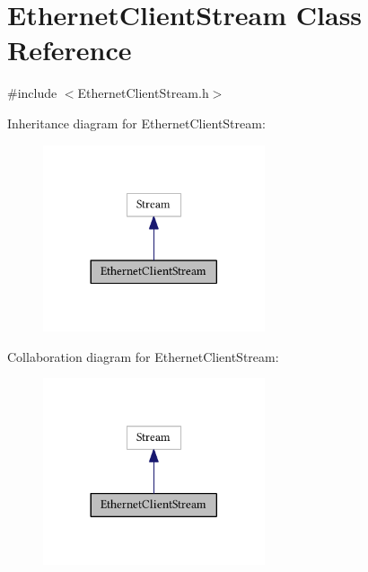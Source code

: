 \hypertarget{class_ethernet_client_stream}{}\section{Ethernet\+Client\+Stream Class Reference}
\label{class_ethernet_client_stream}


{\ttfamily \#include $<$Ethernet\+Client\+Stream.\+h$>$}



Inheritance diagram for Ethernet\+Client\+Stream\+:\nopagebreak
\begin{figure}[H]
\begin{center}
\leavevmode
\includegraphics[width=185pt]{class_ethernet_client_stream__inherit__graph}
\end{center}
\end{figure}


Collaboration diagram for Ethernet\+Client\+Stream\+:\nopagebreak
\begin{figure}[H]
\begin{center}
\leavevmode
\includegraphics[width=185pt]{class_ethernet_client_stream__coll__graph}
\end{center}
\end{figure}

